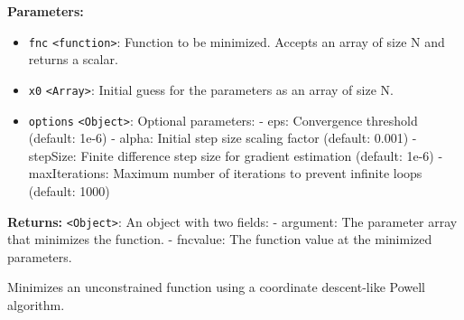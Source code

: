 \documentclass[12pt,a4paper]{article}
\begin{document}
\noindent \textbf{Parameters:}
\begin{itemize}
  \item \texttt{fnc} \texttt{<function>}: Function to be minimized. Accepts an array of size N and returns a scalar.
  \item \texttt{x0} \texttt{<Array>}: Initial guess for the parameters as an array of size N.
  \item \texttt{options} \texttt{<Object>}: Optional parameters:
  - eps: Convergence threshold (default: 1e-6)
  - alpha: Initial step size scaling factor (default: 0.001)
  - stepSize: Finite difference step size for gradient estimation (default: 1e-6)
  - maxIterations: Maximum number of iterations to prevent infinite loops (default: 1000)
\end{itemize}

\noindent \textbf{Returns:} \texttt{<Object>}: An object with two fields:
  - argument: The parameter array that minimizes the function.
  - fncvalue: The function value at the minimized parameters.

\noindent Minimizes an unconstrained function using a coordinate descent-like Powell algorithm.

\vspace{5mm}
\noindent {}
\end{document}
